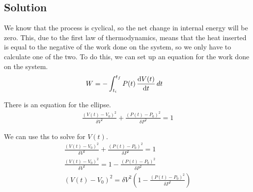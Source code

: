 \documentclass[12pt]{article}
\begin{document}
        \subsection{Solution}
            We know that the process is cyclical, so the net change in internal energy will be zero. 
            This, due to the first law of thermodynamics, means that the heat inserted is equal to the negative of the work done on the system, so we only have to calculate one of the two.
            To do this, we can set up an equation for the work done on the system.
            \begin{align}
                W   &=  -\int_{t_i}^{t_f} P(t)\,\dv{V(t)}{t}\,dt
            \end{align}

            There is an equation for the ellipse.
            \begin{gather}
                \frac{\left( V(t) - V_0 \right)^2}{\delta V^2} + \frac{\left( P(t) - P_0 \right)^2}{\delta P^2} = 1
            \end{gather}

            We can use ths to solve for $V(t)$.
            \begin{gather}
                \frac{\left( V(t) - V_0 \right)^2}{\delta V^2} + \frac{\left( P(t) - P_0 \right)^2}{\delta P^2} = 1\\
                \frac{\left( V(t) - V_0 \right)^2}{\delta V^2} = 1 - \frac{\left( P(t) - P_0 \right)^2}{\delta P^2}\\
                \left( V(t) - V_0 \right)^2 = \delta V^2 \left( 1 - \frac{\left( P(t) - P_0 \right)^2}{\delta P^2} \right)
            \end{gather}
\end{document}
